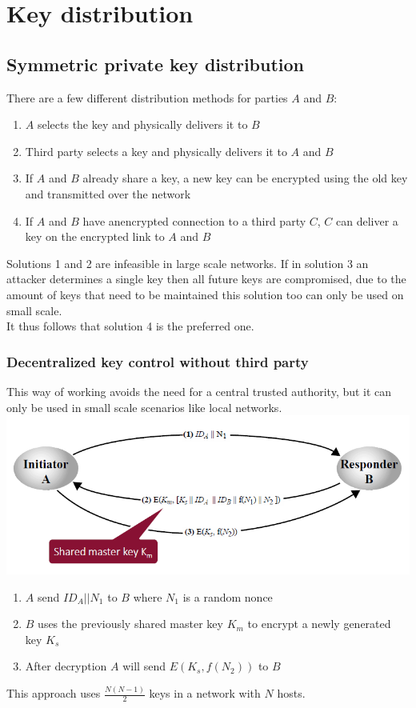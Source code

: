 \documentclass[12pt]{article}
\begin{document}
 \newpage
 \section{Key distribution}
 \subsection{Symmetric private key distribution}
 \noindent{}

 There are a few different distribution methods for parties $A$ and $B$:
 \begin{enumerate}
 	\item $A$ selects the key and physically delivers it to $B$
 	\item Third party selects a key and physically delivers it to $A$ and $B$
 	\item If $A$ and $B$ already share a key, a new key can be encrypted using the old key and transmitted over the network
 	\item If $A$ and $B$ have anencrypted connection to a third party $C$, $C$ can deliver a key on the encrypted link to $A$ and $B$
 \end{enumerate}
 Solutions 1 and 2 are infeasible in large scale networks. If in solution 3 an attacker determines a single key then all future keys are compromised, due to the amount of keys that need to be maintained this solution too can only be used on small scale.\\
 It thus follows that solution 4 is the preferred one.

 \subsubsection{Decentralized key control without third party}
 This way of working avoids the need for a central trusted authority, but it can only be used in small scale scenarios like local networks.\\
 \includegraphics[width=\linewidth]{./slides/L5P1.PNG}
 \begin{enumerate}
 	\item $A$ send $ID_A||N_1$ to $B$ where $N_1$ is a random nonce
 	\item $B$ uses the previously shared master key $K_m$ to encrypt a newly generated key $K_s$
 	\item After decryption $A$ will send $E(K_s, f(N_2))$ to $B$
 \end{enumerate}
This approach uses $\frac{N(N-1)}{2}$ keys in a network with $N$ hosts.
 
\end{document}
